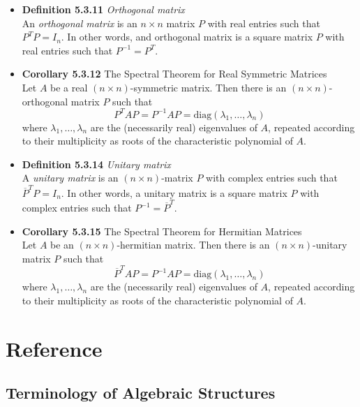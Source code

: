 \documentclass[11pt,a4paper]{article}
\begin{document}
\begin{itemize}
    \item \textbf{Definition 5.3.11} \emph{Orthogonal matrix} \\
        An \emph{orthogonal matrix} is an $n \times n$ matrix $P$ with real entries
        such that $P^T P = I_n$.
        In other words, and orthogonal matrix is a square matrix $P$ with real entries such that
        $P^{-1} = P^T$.

    \item \textbf{Corollary 5.3.12} The Spectral Theorem for Real Symmetric Matrices \\
        Let $A$ be a real $(n \times n)$-symmetric matrix.
        Then there is an $(n \times n)$-orthogonal matrix $P$ such that
        \[
            P^T AP = P^{-1} AP = \mathrm{diag}(\lambda_1, \ldots, \lambda_n)
        \]
        where $\lambda_1, \ldots, \lambda_n$ are the (necessarily real) eigenvalues of $A$,
        repeated according to their multiplicity as roots of the characteristic polynomial of $A$.

    \item \textbf{Definition 5.3.14} \emph{Unitary matrix} \\
        A \emph{unitary matrix} is an $(n \times n)$-matrix $P$ with complex entries such that
        $\overline{P}^T P = I_n$.
        In other words, a unitary matrix is a square matrix $P$ with complex entries such that
        $P^{-1} = \overline{P}^T$.

    \item \textbf{Corollary 5.3.15} The Spectral Theorem for Hermitian Matrices \\
        Let $A$ be an $(n \times n)$-hermitian matrix.
        Then there is an $(n \times n)$-unitary matrix $P$ such that
        \[
            \overline{P}^T AP = P^{-1} AP = \mathrm{diag}(\lambda_1, \ldots, \lambda_n)
        \]
        where $\lambda_1, \ldots, \lambda_n$ are the (necessarily real) eigenvalues of $A$,
        repeated according to their multiplicity as roots of the characteristic polynomial of $A$.

\end{itemize}

\section{Reference}

\subsection{Terminology of Algebraic Structures}
\end{document}
